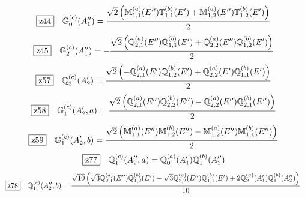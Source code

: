 \documentclass[fleqn,10pt,landscape]{jsarticle}
\begin{document}
\begin{dmath*}
\hspace*{3mm}\fbox{z44}\quad \mathbb{G}_{0}^{(c)}(A_{1}^{\prime\prime})=\frac{\sqrt{2} \left(\mathbb{M}_{1,1}^{(a)}(E^{\prime\prime}) \mathbb{T}_{1,1}^{(b)}(E^{\prime}) + \mathbb{M}_{1,2}^{(a)}(E^{\prime\prime}) \mathbb{T}_{1,2}^{(b)}(E^{\prime})\right)}{2}
\end{dmath*}
\begin{dmath*}
\hspace*{3mm}\fbox{z45}\quad \mathbb{G}_{2}^{(c)}(A_{1}^{\prime\prime})=- \frac{\sqrt{2} \left(\mathbb{Q}_{2,1}^{(a)}(E^{\prime\prime}) \mathbb{Q}_{1,1}^{(b)}(E^{\prime}) + \mathbb{Q}_{2,2}^{(a)}(E^{\prime\prime}) \mathbb{Q}_{1,2}^{(b)}(E^{\prime})\right)}{2}
\end{dmath*}
\begin{dmath*}
\hspace*{3mm}\fbox{z57}\quad \mathbb{Q}_{3}^{(c)}(A_{2}^{\prime})=\frac{\sqrt{2} \left(- \mathbb{Q}_{2,1}^{(a)}(E^{\prime}) \mathbb{Q}_{1,2}^{(b)}(E^{\prime}) + \mathbb{Q}_{2,2}^{(a)}(E^{\prime}) \mathbb{Q}_{1,1}^{(b)}(E^{\prime})\right)}{2}
\end{dmath*}
\begin{dmath*}
\hspace*{3mm}\fbox{z58}\quad \mathbb{G}_{1}^{(c)}(A_{2}^{\prime},a)=\frac{\sqrt{2} \left(\mathbb{Q}_{2,1}^{(a)}(E^{\prime\prime}) \mathbb{Q}_{2,2}^{(b)}(E^{\prime\prime}) - \mathbb{Q}_{2,2}^{(a)}(E^{\prime\prime}) \mathbb{Q}_{2,1}^{(b)}(E^{\prime\prime})\right)}{2}
\end{dmath*}
\begin{dmath*}
\hspace*{3mm}\fbox{z59}\quad \mathbb{G}_{1}^{(c)}(A_{2}^{\prime},b)=\frac{\sqrt{2} \left(\mathbb{M}_{1,1}^{(a)}(E^{\prime\prime}) \mathbb{M}_{1,2}^{(b)}(E^{\prime\prime}) - \mathbb{M}_{1,2}^{(a)}(E^{\prime\prime}) \mathbb{M}_{1,1}^{(b)}(E^{\prime\prime})\right)}{2}
\end{dmath*}
\begin{dmath*}
\hspace*{3mm}\fbox{z77}\quad \mathbb{Q}_{1}^{(c)}(A_{2}^{\prime\prime},a)=\mathbb{Q}_{0}^{(a)}(A_{1}^{\prime}) \mathbb{Q}_{1}^{(b)}(A_{2}^{\prime\prime})
\end{dmath*}
\begin{dmath*}
\hspace*{3mm}\fbox{z78}\quad \mathbb{Q}_{1}^{(c)}(A_{2}^{\prime\prime},b)=\frac{\sqrt{10} \left(\sqrt{3} \mathbb{Q}_{2,1}^{(a)}(E^{\prime\prime}) \mathbb{Q}_{1,2}^{(b)}(E^{\prime}) - \sqrt{3} \mathbb{Q}_{2,2}^{(a)}(E^{\prime\prime}) \mathbb{Q}_{1,1}^{(b)}(E^{\prime}) + 2 \mathbb{Q}_{2}^{(a)}(A_{1}^{\prime}) \mathbb{Q}_{1}^{(b)}(A_{2}^{\prime\prime})\right)}{10}
\end{dmath*}
\end{document}
